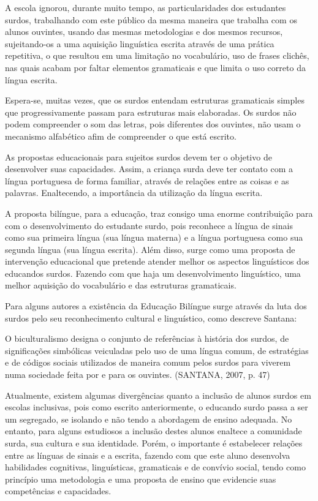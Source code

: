 \documentclass[brasil]{abnt}
\begin{document}
	A escola ignorou, durante muito tempo, as particularidades dos estudantes surdos, trabalhando com este público da mesma maneira que trabalha com os alunos ouvintes, usando das mesmas metodologias e dos mesmos
	recursos, sujeitando-os a uma aquisição linguística escrita através de uma prática repetitiva, o que resultou em uma limitação no vocabulário, uso de frases clichês, nas quais acabam por faltar elementos gramaticais
	e que limita o uso correto da língua escrita. 
	
	Espera-se, muitas vezes, que os surdos entendam estruturas gramaticais simples que progressivamente passam para estruturas mais elaboradas. Os surdos não podem compreender o som das letras, pois diferentes dos ouvintes,
	não usam o mecanismo alfabético afim de compreender o que está escrito. 
	
	As propostas educacionais para sujeitos surdos devem ter o objetivo de desenvolver suas capacidades. Assim, a criança surda deve ter contato com a língua portuguesa de forma familiar, através de relações entre as coisas e
	as palavras. Enaltecendo, a importância da utilização da língua escrita. 
	
	A proposta bilíngue, para a educação, traz consigo uma enorme contribuição para com o desenvolvimento do estudante surdo, pois reconhece a língua de sinais como sua primeira língua (sua língua materna) e a língua portuguesa
	como sua segunda língua (sua língua escrita). Além disso, surge como uma proposta de intervenção educacional que pretende atender melhor os aspectos linguísticos dos educandos surdos. Fazendo com que haja um desenvolvimento 
	linguístico, uma melhor aquisição do vocabulário e das estruturas gramaticais.		
	
	Para alguns autores a existência da Educação Bilíngue surge através da luta dos surdos pelo seu reconhecimento cultural e linguístico, como descreve Santana:
		
		\begin{citacao} O biculturalismo designa o conjunto de referências à história dos surdos, de significações simbólicas veiculadas pelo uso de uma língua comum, de estratégias e de códigos sociais
						utilizados de maneira comum pelos surdos para viverem numa sociedade feita por e para os ouvintes. (SANTANA, 2007, p. 47)	
		\end{citacao}
				
	Atualmente, existem algumas divergências quanto a inclusão de alunos surdos em escolas inclusivas, pois como escrito anteriormente, o educando surdo passa a ser um segregado, se isolando e não tendo a abordagem de ensino
	adequada. No entanto, para alguns estudiosos a inclusão destes alunos enaltece a comunidade surda, sua cultura e sua identidade. Porém, o importante é estabelecer relações entre as línguas de sinais e a escrita, fazendo com
	que este aluno desenvolva habilidades cognitivas, linguísticas, gramaticais e de convívio social, tendo como princípio uma metodologia e uma proposta de ensino que evidencie suas competências e capacidades.      
	
\end{document}
